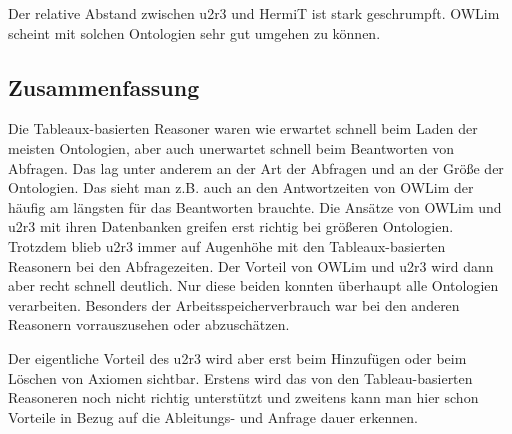 Der relative Abstand zwischen u2r3 und HermiT ist stark geschrumpft. OWLim scheint mit solchen Ontologien sehr gut umgehen zu können.

\subsection{Zusammenfassung}
Die Tableaux-basierten Reasoner waren wie erwartet schnell beim Laden der meisten Ontologien, aber auch unerwartet schnell beim Beantworten von Abfragen. Das lag unter anderem an der Art der Abfragen und an der Größe der Ontologien. Das sieht man z.B. auch an den Antwortzeiten von OWLim der häufig am längsten für das Beantworten brauchte. Die Ansätze von OWLim und u2r3 mit ihren Datenbanken greifen erst richtig bei größeren  Ontologien. Trotzdem blieb u2r3 immer auf Augenhöhe mit den Tableaux-basierten Reasonern bei den Abfragezeiten. Der Vorteil von OWLim und u2r3 wird dann aber recht schnell deutlich. Nur diese beiden konnten überhaupt alle Ontologien verarbeiten. Besonders der Arbeitsspeicherverbrauch war bei den anderen Reasonern vorrauszusehen oder abzuschätzen.

Der eigentliche Vorteil des u2r3 wird aber erst beim Hinzufügen oder beim Löschen von Axiomen sichtbar. Erstens wird das von den Tableau-basierten Reasoneren noch nicht richtig unterstützt und zweitens kann man hier schon Vorteile in Bezug auf die Ableitungs- und Anfrage dauer erkennen.